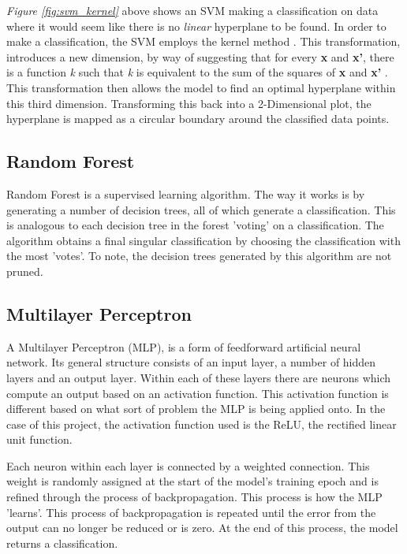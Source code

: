 \documentclass[11pt, a4paper]{article}
\begin{document}
\emph{Figure \ref{fig:svm_kernel}} above shows an SVM making a classification on data where it would seem like there is no \emph{linear} hyperplane to be found. In order to make a classification, the SVM employs the kernel method \cite{ray2017svm}. This transformation, introduces a new dimension, by way of suggesting that for every \textbf{x} and \textbf{x'}, there is a function \emph{k} such that \emph{k} is equivalent to the sum of the squares of \textbf{x} and \textbf{x'} \cite{hofmann2008kernel}. This transformation then allows the model to find an optimal hyperplane within this third dimension. Transforming this back into a 2-Dimensional plot, the hyperplane is mapped as a circular boundary around the classified data points.

\subsection{Random Forest}

Random Forest is a supervised learning algorithm. The way it works is by generating a number of decision trees, all of which generate a classification. This is analogous to each decision tree in the forest 'voting' on a classification. The algorithm obtains a final singular classification by choosing the classification with the most 'votes'. To note, the decision trees generated by this algorithm are not pruned. 

\subsection{Multilayer Perceptron}

A Multilayer Perceptron (MLP), is a form of feedforward artificial neural network. Its general structure consists of an input layer, a number of hidden layers and an output layer. Within each of these layers there are neurons which compute an output based on an activation function. This activation function is different based on what sort of problem the MLP is being applied onto. In the case of this project, the activation function used is the ReLU, the rectified linear unit function.
 
Each neuron within each layer is connected by a weighted connection. This weight is randomly assigned at the start of the model's training epoch and is refined through the process of backpropagation. This process is how the MLP 'learns'. This process of backpropagation is repeated until the error from the output can no longer be reduced or is zero. At the end of this process, the model returns a classification. 
  
\end{document}
